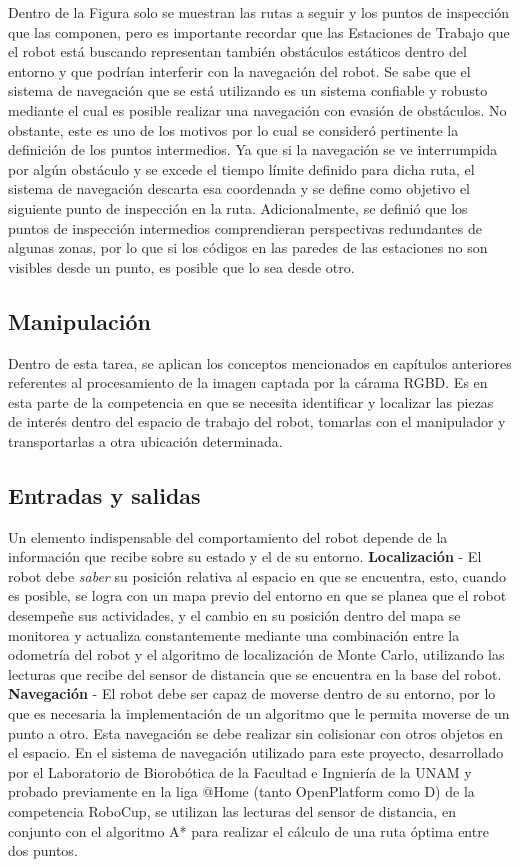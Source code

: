 Dentro de la Figura solo se muestran las rutas a seguir y los puntos de inspección que las componen, pero es importante recordar que las Estaciones de Trabajo que el robot está buscando representan también obstáculos estáticos dentro del entorno y que podrían interferir con la navegación del robot. Se sabe que el sistema de navegación que se está utilizando es un sistema confiable y robusto mediante el cual es posible realizar una navegación con evasión de obstáculos. 
No obstante, este es uno de los motivos por lo cual se consideró pertinente la definición de los puntos intermedios. Ya que si la navegación se ve interrumpida por  algún obstáculo y se excede el tiempo límite definido para dicha ruta, el sistema de navegación descarta esa coordenada y se define como objetivo el siguiente punto de inspección en la ruta. Adicionalmente, se definió que los puntos de inspección intermedios comprendieran perspectivas redundantes de algunas zonas, por lo que si los códigos en las paredes de las estaciones no son visibles desde un punto, es posible que lo sea desde otro.

\subsection{Manipulación}
Dentro de esta tarea, se aplican los conceptos mencionados en capítulos anteriores referentes al procesamiento de la imagen captada por la cárama RGBD. 
Es en esta parte de la competencia en que se necesita identificar y localizar las piezas de interés dentro del espacio de trabajo del robot, tomarlas con el manipulador y transportarlas a otra ubicación determinada.

\subsection{Entradas y salidas}
Un elemento indispensable del comportamiento del robot depende de la información que recibe sobre su estado y el de su entorno.
\textbf{Localización} - El robot debe \textit{saber} su posición relativa al espacio en que se encuentra, esto, cuando es posible, se logra con un mapa previo del entorno en que se planea que el robot desempeñe sus actividades, y el cambio en su posición dentro del mapa se monitorea y actualiza constantemente mediante una combinación entre la odometría del robot y el algoritmo de localización de Monte Carlo, utilizando las lecturas que recibe del sensor de distancia que se encuentra en la  base del robot.
\textbf{Navegación} - El robot debe ser capaz de moverse dentro de su entorno, por lo que es necesaria la implementación de un algoritmo que le permita moverse de un punto a otro. Esta navegación se debe realizar sin colisionar con otros objetos en el espacio. En el sistema de navegación utilizado para este proyecto, desarrollado por el Laboratorio de Biorobótica de la Facultad e Ingniería de la UNAM y probado previamente en la liga @Home (tanto OpenPlatform como D) de la competencia RoboCup, se utilizan las lecturas del sensor de distancia, en conjunto con el algoritmo A* para realizar el cálculo de una ruta óptima entre dos puntos. 

